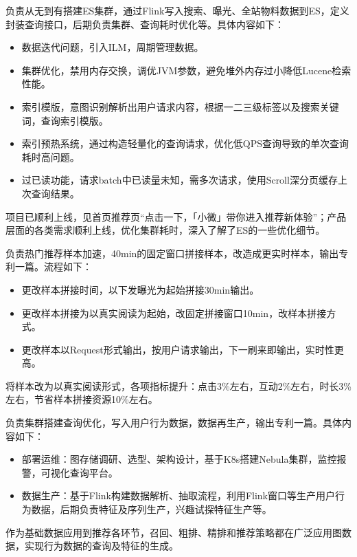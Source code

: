 \documentclass{resume}
\begin{document}
\begin{onehalfspacing}  负责从无到有搭建ES集群，通过Flink写入搜索、曝光、全站物料数据到ES，定义封装查询接口，后期负责集群、查询耗时优化等。具体内容如下：
\begin{itemize}
 \item 数据迭代问题，引入ILM，周期管理数据。
 \item 集群优化，禁用内存交换，调优JVM参数，避免堆外内存过小降低Lucene检索性能。
 \item 索引模版，意图识别解析出用户请求内容，根据一二三级标签以及搜索关键词，查询索引模版。
 \item 索引预热系统，通过构造轻量化的查询请求，优化低QPS查询导致的单次查询耗时高问题。
 \item 过已读功能，请求batch中已读量未知，需多次请求，使用Scroll深分页缓存上次查询结果。
\end{itemize}
\end{onehalfspacing}
\begin{onehalfspacing}  项目已顺利上线，见首页推荐页“点击一下，「小微」带你进入推荐新体验”；产品层面的各类需求顺利上线，优化集群耗时，深入了解了ES的一些优化细节。
\end{onehalfspacing}

\begin{onehalfspacing}  负责热门推荐样本加速，40min的固定窗口拼接样本，改造成更实时样本，输出专利一篇。流程如下：
\begin{itemize}
  \item 更改样本拼接时间，以下发曝光为起始拼接30min输出。
  \item 更改样本拼接为以真实阅读为起始，改固定拼接窗口10min，改样本拼接方式。
  \item 更改样本以Request形式输出，按用户请求输出，下一刷来即输出，实时性更高。
\end{itemize}
\end{onehalfspacing}
\begin{onehalfspacing} 将样本改为以真实阅读形式，各项指标提升：点击3\%左右，互动2\%左右，时长3\%左右，节省样本拼接资源10\%左右。
\end{onehalfspacing}

\begin{onehalfspacing}  负责集群搭建查询优化，写入用户行为数据，数据再生产，输出专利一篇。具体内容如下：
\begin{itemize}
 \item 部署运维：图存储调研、选型、架构设计，基于K8s搭建Nebula集群，监控报警，可视化查询平台。
 \item 数据生产：基于Flink构建数据解析、抽取流程，利用Flink窗口等生产用户行为数据，后期负责特征及序列生产，兴趣试探特征生产等。
\end{itemize}
\end{onehalfspacing}
\begin{onehalfspacing} 作为基础数据应用到推荐各环节，召回、粗排、精排和推荐策略都在广泛应用图数据，实现行为数据的查询及特征的生成。
\end{onehalfspacing}
\end{document}
